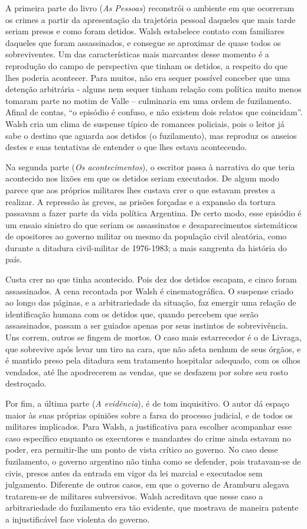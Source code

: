 A primeira parte do livro (\emph{As Pessoas}) reconstrói o ambiente em
que ocorreram os crimes a partir da apresentação da trajetória pessoal
daqueles que mais tarde seriam presos e como foram detidos. Walsh
estabelece contato com familiares daqueles que foram assassinados, e
consegue se aproximar de quase todos os sobreviventes. Um das
características mais marcantes desse momento é a reprodução do campo de
perspectiva que tinham os detidos, a respeito do que lhes poderia
acontecer. Para muitos, não era sequer possível conceber que uma
detenção arbitrária - alguns nem sequer tinham relação com política
muito menos tomaram parte no motim de Valle -- culminaria em uma ordem
de fuzilamento. Afinal de contas, ``o episódio é confuso, e não existem
dois relatos que coincidam''. Walsh cria um clima de suspense típico de
romances policiais, pois o leitor já sabe o destino que aguarda aos
detidos (o fuzilamento), mas reproduz os anseios destes e suas
tentativas de entender o que lhes estava acontecendo.

Na segunda parte (\emph{Os acontecimentos}), o escritor passa à
narrativa do que teria acontecido nos lixões em que os detidos seriam
executados. De algum modo parece que aos próprios militares lhes custava
crer o que estavam prestes a realizar. A repressão às greves, as prisões
forçadas e a expansão da tortura passavam a fazer parte da vida política
Argentina. De certo modo, esse episódio é um ensaio sinistro do que
seriam os assassinatos e desaparecimentos sistemáticos de opositores ao
governo militar ou mesmo da população civil aleatória, como durante a
ditadura civil-militar de 1976-1983; a mais sangrenta da história do
país.

Custa crer no que tinha acontecido. Pois dez dos detidos escapam, e
cinco foram assassinados. A cena recontada por Walsh é cinematográfica.
O suspense criado ao longo das páginas, e a arbitrariedade da situação,
faz emergir uma relação de identificação humana com os detidos que,
quando percebem que serão assassinados, passam a ser guiados apenas por
seus instintos de sobrevivência. Uns correm, outros se fingem de mortos.
O caso mais estarrecedor é o de Livraga, que sobrevive após levar um
tiro na cara, que não afeta nenhum de seus órgãos, e é mantido preso
pela ditadura sem tratamento hospitalar adequado, com os olhos vendados,
até lhe apodrecerem as vendas, que se desfazem por sobre seu rosto
destroçado.

Por fim, a última parte (\emph{A evidência}), é de tom inquisitivo. O
autor dá espaço maior às suas próprias opiniões sobre a farsa do
processo judicial, e de todos os militares implicados. Para Walsh, a
justificativa para escolher acompanhar esse caso específico enquanto os
executores e mandantes do crime ainda estavam no poder, era permitir-lhe
um ponto de vista crítico ao governo. No caso desse fuzilamento, o
governo argentino não tinha como se defender, pois tratavam-se de civis,
presos antes da entrada em vigor da lei marcial e executados sem
julgamento. Diferente de outros casos, em que o governo de Aramburu
alegava tratarem-se de militares subversivos. Walsh acreditava que nesse
caso a arbitrariedade do fuzilamento era tão evidente, que mostrava de
maneira patente a injustificável face violenta do governo.

